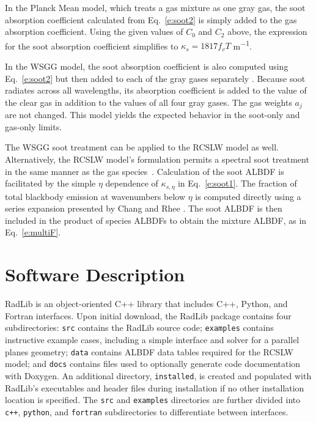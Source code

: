 \documentclass[preprint,12pt]{elsarticle}
\newcounter{bla}
\begin{document}
In the Planck Mean model, which treats a gas mixture as one gray gas, the soot absorption coefficient calculated from Eq.~\ref{e:soot2} is simply added to the gas absorption coefficient. Using the given values of $C_0$ and $C_2$ above, the expression for the soot absorption coefficient simplifies to  $\kappa_s=1817f_vT$ \si{m^{-1}}.
 
In the WSGG model, the soot absorption coefficient is also computed using Eq.~\ref{e:soot2} but then added to each of the gray gases separately \cite{Bordbar_personal}. Because soot radiates across all wavelengths, its absorption coefficient is added to the value of the clear gas in addition to the values of all four gray gases. The gas weights $a_j$ are not changed. This model yields the expected behavior in the soot-only and gas-only limits.

The WSGG soot treatment can be applied to the RCSLW model as well. Alternatively, the RCSLW model's formulation permits a spectral soot treatment in the same manner as the gas species~\cite{Solovjov_2001}. Calculation of the soot ALBDF is facilitated by the simple $\eta$ dependence of $\kappa_{s,\eta}$ in Eq.~\ref{e:soot1}. The fraction of total blackbody emission at wavenumbers below $\eta$ is computed directly using a series expansion presented by Chang and Rhee \cite{Chang_1984}. The soot ALBDF is then included in the product of species ALBDFs to obtain the mixture ALBDF, as in Eq.~\ref{e:multiF}. 

 

\section{Software Description} \label{s:architechture}

RadLib is an object-oriented C++ library that includes C++, Python, and Fortran interfaces. Upon initial download, the RadLib package contains four subdirectories: \texttt{src} contains the RadLib source code; \texttt{examples} contains instructive example cases, including a simple interface and solver for a parallel planes geometry; \texttt{data} contains ALBDF data tables required for the RCSLW model; and \texttt{docs} contains files used to optionally generate code documentation with Doxygen. An additional directory, \texttt{installed}, is created and populated with RadLib's executables and header files during installation if no other installation location is specified.
The \texttt{src} and \texttt{examples} directories are further divided into \texttt{c++}, \texttt{python}, and \texttt{fortran} subdirectories to differentiate between interfaces. 
\end{document}
